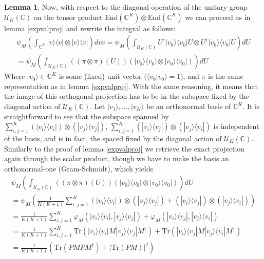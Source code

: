 \documentclass{article}
\def\C{\mathbb{C}}
\def\U{\mathcal{U}}
\def\End{\text{End}}
\def\Tr{\text{Tr}}
\theoremstyle{definition}
\newtheorem{lem}[Satz]{Lemma}
\begin{document}
\begin{lem}
Now, with respect to the diagonal operation of the unitary group $\U_K(\C)$ on the tensor product $\End(\C^K) \otimes \End(\C^K)$ we can proceed as in lemma \ref{expvalproj} and rewrite the integral as follows:
\begin{align*}
  \psi_M(\int_{\C^K}|v \rangle \langle v| \otimes |v \rangle \langle v|) dvv = \psi_M( \int_{\U_K(\C)} U^\dagger |v_0 \rangle \langle v_0| U \otimes U^\dagger |v_0 \rangle \langle v_0| U) dU \\ = \psi_M( \int_{\U_K(\C)} ((\pi \otimes \pi)(U))( |v_0 \rangle \langle v_0|  \otimes |v_0 \rangle \langle v_0|)) dU
\end{align*}
Where $|v_0 \rangle \in \C^K$ is some (fixed) unit vector ($\langle v_0 | v_0 \rangle = 1$), and $\pi$ is the same representation as in lemma \ref{expvalproj}. With the same reasoning, it means that the image of this orthogonal projection has to be in the subspace fixed by the diagonal action of $\U_K(\C)$. Let $|v_1 \rangle, \ldots, |v_K \rangle$ be an orthonormal basis of $\C^K$. It is straightforward to see that the subspace spanned by $\sum_{i,j=1}^K (|v_i \rangle \langle v_i |) \otimes (|v_j \rangle \langle v_j |)  $, $\sum_{i,j=1}^K (|v_i \rangle \langle v_j |) \otimes (|v_j \rangle \langle v_i |)$ is independent of the basis, and is in fact, the spaced fixed by the diagonal action of $\U_K(\C)$. Similarly to the proof of lemma \ref{expvalproj} we retrieve the exact projection again through the scalar product, though we have to make the basis an orthonormal-one (Gram-Schmidt), which yields
\begin{align*}
\psi_M( \int_{\U_K(\C)} ((\pi \otimes \pi)(U))( |v_0 \rangle \langle v_0|  \otimes |v_0 \rangle \langle v_0|)) dU \\
 = \psi_M(  \frac{1}{K(K+1)} \sum_{i,j=1}^K (|v_i \rangle \langle v_i |) \otimes (|v_j \rangle \langle v_j |) + (|v_i \rangle \langle v_j |) \otimes (|v_j \rangle \langle v_i |)) \\
=    \frac{1}{K(K+1)} \sum_{i,j=1}^K \varphi_M(|v_i \rangle \langle v_i |,|v_j \rangle \langle v_j |) + \varphi_M(|v_i \rangle \langle v_j |, |v_j \rangle \langle v_i |) \\
=  \frac{1}{K(K+1)} \sum_{i,j=1}^K \Tr(|v_i \rangle \langle v_i | M |v_j \rangle \langle v_j | M^\dagger) + \Tr(|v_i \rangle \langle v_j | M |v_j \rangle \langle v_i | M^\dagger) \\ 
=  \frac{1}{K(K+1)} (\Tr(P M P M^\dagger) + |\Tr(P M)|^2)
\end{align*}
\end{lem}
\end{document}
